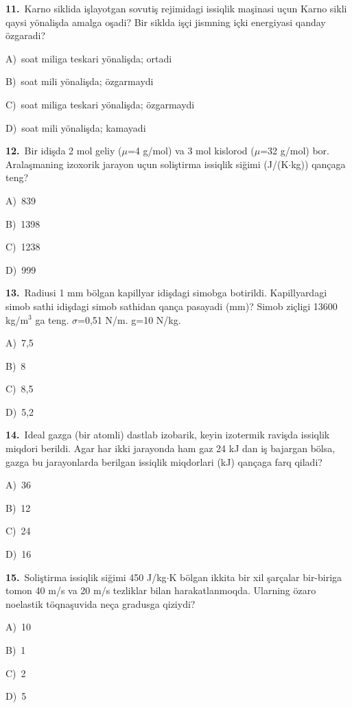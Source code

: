 \documentclass[11pt,a4paper]{article}
\newcommand{\opt}[2]{\hspace*{4mm}#1)\ #2\par}
\begin{document}
\noindent\begin{minipage}{\linewidth}
\textbf{11.}\ Karno siklida işlayotgan sovutiş rejimidagi issiqlik maşinasi uçun Karno sikli qaysi yönalişda amalga oşadi? Bir siklda işçi jismning içki energiyasi qanday özgaradi?\par\smallskip
\opt{A}{soat miliga teskari yönalişda; ortadi}
\opt{B}{soat mili yönalişda; özgarmaydi}
\opt{C}{soat miliga teskari yönalişda; özgarmaydi}
\opt{D}{soat mili yönalişda; kamayadi}
\end{minipage}\vspace{9pt}\par
\noindent\begin{minipage}{\linewidth}
\textbf{12.}\ Bir idişda 2 mol geliy ($\mu$=4 g/mol) va 3 mol kislorod ($\mu$=32 g/mol) bor. Aralaşmaning izoxorik jarayon uçun soliştirma issiqlik siğimi (J/(K$\cdot$kg)) qançaga teng?\par\smallskip
\opt{A}{839}
\opt{B}{1398}
\opt{C}{1238}
\opt{D}{999}
\end{minipage}\vspace{9pt}\par
\noindent\begin{minipage}{\linewidth}
\textbf{13.}\ Radiusi 1 mm bölgan kapillyar idişdagi simobga botirildi. Kapillyardagi simob sathi idişdagi simob sathidan qança pasayadi (mm)? Simob ziçligi 13600 kg/m$^{3}$ ga teng. $\sigma$=0,51 N/m. g=10 N/kg.\par\smallskip
\opt{A}{7,5}
\opt{B}{8}
\opt{C}{8,5}
\opt{D}{5,2}
\end{minipage}\vspace{9pt}\par
\noindent\begin{minipage}{\linewidth}
\textbf{14.}\ Ideal gazga (bir atomli) dastlab izobarik, keyin izotermik ravişda issiqlik miqdori berildi. Agar har ikki jarayonda ham gaz 24 kJ dan iş bajargan bölsa, gazga bu jarayonlarda berilgan issiqlik miqdorlari (kJ) qançaga farq qiladi?\par\smallskip
\opt{A}{36}
\opt{B}{12}
\opt{C}{24}
\opt{D}{16}
\end{minipage}\vspace{9pt}\par
\noindent\begin{minipage}{\linewidth}
\textbf{15.}\ Soliştirma issiqlik siğimi 450 J/kg$\cdot$K bölgan ikkita bir xil şarçalar bir-biriga tomon 40 m/s va 20 m/s tezliklar bilan harakatlanmoqda. Ularning özaro noelastik töqnaşuvida neça gradusga qiziydi?\par\smallskip
\opt{A}{10}
\opt{B}{1}
\opt{C}{2}
\opt{D}{5}
\end{minipage}\vspace{9pt}\par
\end{document}

